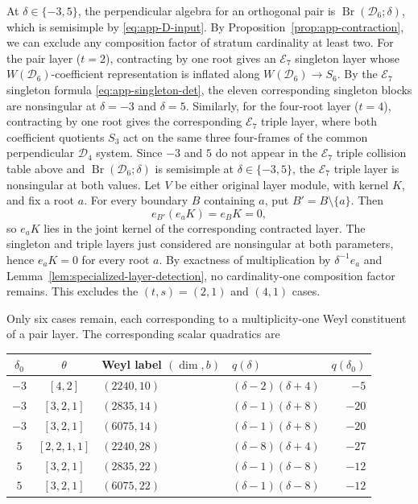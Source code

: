 \documentclass[11pt,a4paper]{amsart}
\newcommand{\Br}{\operatorname{Br}}\newcommand{\Irr}{\operatorname{Irr}}
\theoremstyle{uprightdefinition}
\theoremstyle{remark}\newtheorem{remark}[theorem]{Remark}
\begin{document}
At $\delta\in\{-3,5\}$, the perpendicular algebra for an orthogonal pair is
$\Br(\mathscr{D}_6;\delta)$, which is semisimple by \eqref{eq:app-D-input}. By Proposition~\ref{prop:app-contraction}, we can exclude any
composition factor of stratum cardinality at least two.
For the pair layer ($t=2$), contracting by one root gives an $\mathscr{E}_7$ singleton layer
whose $W(\mathscr{D}_6)$-coefficient representation is inflated along $W(\mathscr{D}_6)\to S_6$.
By the $\mathscr{E}_7$ singleton formula \eqref{eq:app-singleton-det}, the eleven corresponding singleton blocks are
nonsingular at $\delta=-3$ and $\delta=5$.
Similarly, for the four-root layer ($t=4$), contracting by one root gives the corresponding
$\mathscr{E}_7$ triple layer, where both coefficient quotients $S_3$ act on the same three four-frames of the common perpendicular $\mathscr{D}_4$ system.
Since $-3$ and $5$ do not appear in the $\mathscr{E}_7$ triple collision table above and $\Br(\mathscr{D}_6;\delta)$ is semisimple at $\delta\in\{-3,5\}$, the $\mathscr{E}_7$ triple layer is nonsingular at both values.
Let $V$ be either original layer module, with kernel $K$, and fix a root $a$.
For every boundary $B$ containing $a$, put $B'=B\setminus\{a\}$. Then
\[
 e_{B'}(e_aK)=e_BK=0,
\]
so $e_aK$ lies in the joint kernel of the corresponding contracted layer.
The singleton and triple layers just considered are nonsingular at both
parameters, hence $e_aK=0$ for every root $a$. By exactness of multiplication
by $\delta^{-1}e_a$ and Lemma~\ref{lem:specialized-layer-detection}, no
cardinality-one composition factor remains. This excludes the
$(t,s)=(2,1)$ and $(4,1)$ cases.

Only six cases remain, each corresponding to a multiplicity-one Weyl
constituent of a pair layer. The corresponding scalar quadratics are
\begin{center}\small
\begin{tabular}{ccllr}
\toprule
$\delta_0$&$\theta$&Weyl label $(\dim,b)$&$q(\delta)$&$q(\delta_0)$\\\midrule
$-3$&$[4,2]$&$(2240,10)$&$(\delta-2)(\delta+4)$&$-5$\\
$-3$&$[3,2,1]$&$(2835,14)$&$(\delta-1)(\delta+8)$&$-20$\\
$-3$&$[3,2,1]$&$(6075,14)$&$(\delta-1)(\delta+8)$&$-20$\\
$5$&$[2,2,1,1]$&$(2240,28)$&$(\delta-8)(\delta+4)$&$-27$\\
$5$&$[3,2,1]$&$(2835,22)$&$(\delta-1)(\delta-8)$&$-12$\\
$5$&$[3,2,1]$&$(6075,22)$&$(\delta-1)(\delta-8)$&$-12$\\
\bottomrule
\end{tabular}
\end{center}
\end{document}
